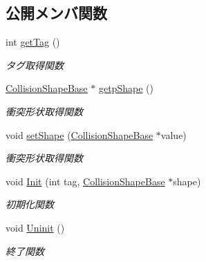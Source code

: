 \subsection*{公開メンバ関数}
\begin{DoxyCompactItemize}
\item 
int \mbox{\hyperlink{class_collision_object_1_1_shape_a6a667cdd25268a81aeff777dec82884c}{get\+Tag}} ()
\begin{DoxyCompactList}\small\item\em タグ取得関数 \end{DoxyCompactList}\item 
\mbox{\hyperlink{class_collision_shape_base}{Collision\+Shape\+Base}} $\ast$ \mbox{\hyperlink{class_collision_object_1_1_shape_a4152f043bde34b7d704f163ab1dd87b8}{getp\+Shape}} ()
\begin{DoxyCompactList}\small\item\em 衝突形状取得関数 \end{DoxyCompactList}\item 
void \mbox{\hyperlink{class_collision_object_1_1_shape_a3eeea0fcf0f2f722075327560f2599be}{set\+Shape}} (\mbox{\hyperlink{class_collision_shape_base}{Collision\+Shape\+Base}} $\ast$value)
\begin{DoxyCompactList}\small\item\em 衝突形状取得関数 \end{DoxyCompactList}\item 
void \mbox{\hyperlink{class_collision_object_1_1_shape_acb8e74104e7a77a7d4a19165e361d9a8}{Init}} (int tag, \mbox{\hyperlink{class_collision_shape_base}{Collision\+Shape\+Base}} $\ast$shape)
\begin{DoxyCompactList}\small\item\em 初期化関数 \end{DoxyCompactList}\item 
void \mbox{\hyperlink{class_collision_object_1_1_shape_a0190480a97516ac248069d1060e7e57e}{Uninit}} ()
\begin{DoxyCompactList}\small\item\em 終了関数 \end{DoxyCompactList}\end{DoxyCompactItemize}

